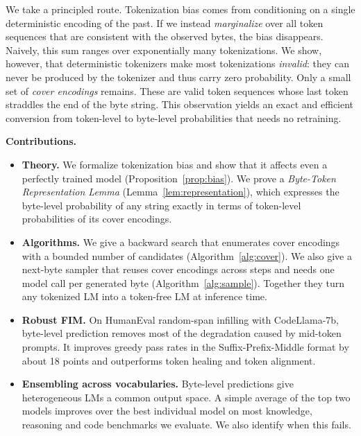\documentclass{article} %
\begin{document}
We take a principled route. Tokenization bias comes from conditioning on a single deterministic encoding of the past. If we instead \emph{marginalize} over all token sequences that are consistent with the observed bytes, the bias disappears. Naively, this sum ranges over exponentially many tokenizations. We show, however, that deterministic tokenizers make most tokenizations \emph{invalid}: they can never be produced by the tokenizer and thus carry zero probability. Only a small set of \emph{cover encodings} remains. These are valid token sequences whose last token straddles the end of the byte string. This observation yields an exact and efficient conversion from token-level to byte-level probabilities that needs no retraining.

\textbf{Contributions.}
\begin{itemize}
\item \textbf{Theory.} We formalize tokenization bias and show that it affects even a perfectly trained model (Proposition~\ref{prop:bias}). We prove a \emph{Byte-Token Representation Lemma} (Lemma~\ref{lem:representation}), which expresses the byte-level probability of any string exactly in terms of token-level probabilities of its cover encodings.
\item \textbf{Algorithms.} We give a backward search that enumerates cover encodings with a bounded number of candidates (Algorithm~\ref{alg:cover}). We also give a next-byte sampler that reuses cover encodings across steps and needs one model call per generated byte (Algorithm~\ref{alg:sample}). Together they turn any tokenized LM into a token-free LM at inference time.
\item \textbf{Robust FIM.} On HumanEval random-span infilling with CodeLlama-7b, byte-level prediction removes most of the degradation caused by mid-token prompts. It improves greedy pass rates in the Suffix-Prefix-Middle format by about 18 points and outperforms token healing and token alignment.
\item \textbf{Ensembling across vocabularies.} Byte-level predictions give heterogeneous LMs a common output space. A simple average of the top two models improves over the best individual model on most knowledge, reasoning and code benchmarks we evaluate. We also identify when this fails.
\end{itemize}
\end{document}
